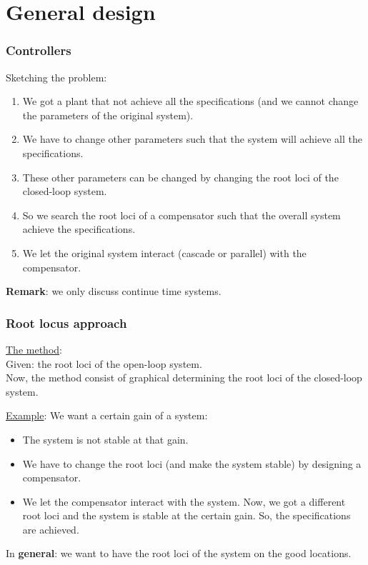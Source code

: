 \section{General design}

\begin{frame}
	\frametitle{Controllers}
		Sketching the problem:
		\begin{enumerate}
			\item We got a plant that not achieve all the specifications (and we cannot change the parameters of the original system).
			\item We have to change other parameters such that the system will achieve all the specifications.
			\item These other parameters can be changed by changing the root loci of the closed-loop system. 
			\item So we search the root loci of a compensator such that the overall system achieve the specifications. 
			\item We let the original system interact (cascade or parallel) with the compensator.
		\end{enumerate}
		\vspace{3mm}
		
		\textbf{Remark}: we only discuss continue time systems. 
\end{frame}

\begin{frame}
	\frametitle{Root locus approach}
	\underline{The method}:\\
	Given: the root loci of the open-loop system.\\
	Now, the method consist of graphical determining the root loci of the closed-loop system.\vspace{3mm}

	\underline{Example}: 
	We want a certain gain of a system:
	\begin{itemize}
		\item The system is not stable at that gain.
		\item We have to change the root loci (and make the system stable) by designing a compensator.
		\item We let the compensator interact with the system. Now, we got a different root loci and the system is stable at the certain gain. So, the specifications are achieved.
	\end{itemize}
	\vspace{2mm}
	
	In \textbf{general}: we want to have the root loci of the system on the good locations.
\end{frame}

